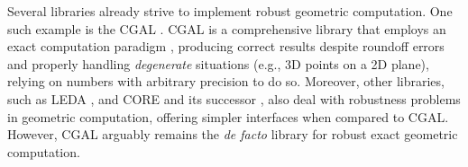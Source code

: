 Several libraries already strive to implement robust geometric computation.  One
such example is the \acf{CGAL} \cite{CGAL:2018}.  \ac{CGAL} is a comprehensive
library that employs an exact computation paradigm \cite{Yap:1995:ECP},
producing correct results despite roundoff errors and properly handling
\textit{degenerate} situations (e.g., 3D points on a 2D plane), relying on
numbers with arbitrary precision to do so.  Moreover, other libraries, such as
\acs{LEDA}\label{acro:LEDA} \cite{LEDA:2017,Mehlhorn:1989:LEDA}, and CORE
\cite{Karamcheti:1999:CLRNGC} and its successor \cite{Yu:2010:CORE2}, also deal
with robustness problems in geometric computation, offering simpler interfaces
when compared to \ac{CGAL}.  However, \ac{CGAL} arguably remains the \textit{de
facto} library for robust exact geometric computation.
